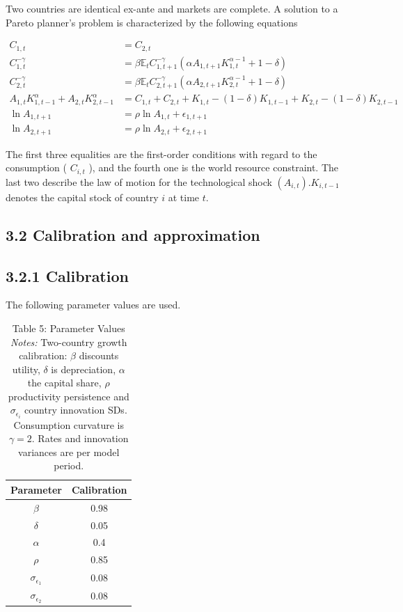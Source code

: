 \documentclass[12pt]{article}
\begin{document}
Two countries are identical ex-ante and markets are complete. A solution to a Pareto planner's problem is characterized by the following equations

$$
\begin{aligned}
C_{1, t} & =C_{2, t} \\
C_{1, t}^{-\gamma} & =\beta \mathbb{E}_{t} C_{1, t+1}^{-\gamma}\left(\alpha A_{1, t+1} K_{1, t}^{\alpha-1}+1-\delta\right) \\
C_{2, t}^{-\gamma} & =\beta \mathbb{E}_{t} C_{2, t+1}^{-\gamma}\left(\alpha A_{2, t+1} K_{2, t}^{\alpha-1}+1-\delta\right) \\
A_{1, t} K_{1, t-1}^{\alpha}+A_{2, t} K_{2, t-1}^{\alpha} & =C_{1, t}+C_{2, t}+K_{1, t}-(1-\delta) K_{1, t-1}+K_{2, t}-(1-\delta) K_{2, t-1} \\
\ln A_{1, t+1} & =\rho \ln A_{1, t}+\epsilon_{1, t+1} \\
\ln A_{2, t+1} & =\rho \ln A_{2, t}+\epsilon_{2, t+1}
\end{aligned}
$$

The first three equalities are the first-order conditions with regard to the consumption ( $C_{i, t}$ ), and the fourth one is the world resource constraint. The last two describe the law of motion for the technological shock $\left(A_{i, t}\right) . K_{i, t-1}$ denotes the capital stock of country $i$ at time $t$.

\subsection*{3.2 Calibration and approximation}
\subsection*{3.2.1 Calibration}
The following parameter values are used.

\begin{table}[h]
\begin{center}
\begin{tabular}{cc}
\hline\hline
Parameter & Calibration \\
\hline
$\beta$ & 0.98 \\
$\delta$ & 0.05 \\
$\alpha$ & 0.4 \\
$\rho$ & 0.85 \\
$\sigma_{\epsilon_{1}}$ & 0.08 \\
$\sigma_{\epsilon_{2}}$ & 0.08 \\
\hline\hline
\end{tabular}
\captionsetup{labelformat=empty}
\caption{Table 5: Parameter Values\\ \footnotesize\textit{Notes:} Two-country growth calibration: $\beta$ discounts utility, $\delta$ is depreciation, $\alpha$ the capital share, $\rho$ productivity persistence and $\sigma_{\epsilon_i}$ country innovation SDs. Consumption curvature is $\gamma=2$. Rates and innovation variances are per model period.}
\end{center}
\end{table}
\end{document}
